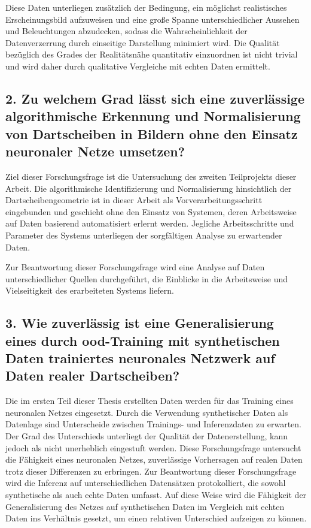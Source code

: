 Diese Daten unterliegen zusätzlich der Bedingung, ein möglichst realistisches Erscheinungsbild aufzuweisen und eine große Spanne unterschiedlicher Aussehen und Beleuchtungen abzudecken, sodass die Wahrscheinlichkeit der Datenverzerrung durch einseitige Darstellung minimiert wird. Die Qualität bezüglich des Grades der Realitätsnähe quantitativ einzuordnen ist nicht trivial und wird daher durch qualitative Vergleiche mit echten Daten ermittelt.

\subsection*{2. Zu welchem Grad lässt sich eine zuverlässige algorithmische Erkennung und Normalisierung von Dartscheiben in Bildern ohne den Einsatz neuronaler Netze umsetzen?}

Ziel dieser Forschungsfrage ist die Untersuchung des zweiten Teilprojekts dieser Arbeit. Die algorithmische Identifizierung und Normalisierung hinsichtlich der Dartscheibengeometrie ist in dieser Arbeit als Vorverarbeitungsschritt eingebunden und geschieht ohne den Einsatz von Systemen, deren Arbeitsweise auf Daten basierend automatisiert erlernt werden. Jegliche Arbeitsschritte und Parameter des Systems unterliegen der sorgfältigen Analyse zu erwartender Daten.

Zur Beantwortung dieser Forschungsfrage wird eine Analyse auf Daten unterschiedlicher Quellen durchgeführt, die Einblicke in die Arbeitsweise und Vielseitigkeit des erarbeiteten Systems liefern.

\subsection*{3. Wie zuverlässig ist eine Generalisierung eines durch \ac{ood}-Training mit synthetischen Daten trainiertes neuronales Netzwerk auf Daten realer Dartscheiben?}

Die im ersten Teil dieser Thesis erstellten Daten werden für das Training eines neuronalen Netzes eingesetzt. Durch die Verwendung synthetischer Daten als Datenlage sind Unterscheide zwischen Trainings- und Inferenzdaten zu erwarten. Der Grad des Unterschieds unterliegt der Qualität der Datenerstellung, kann jedoch als nicht unerheblich eingestuft werden. Diese Forschungsfrage untersucht die Fähigkeit eines neuronalen Netzes, zuverlässige Vorhersagen auf realen Daten trotz dieser Differenzen zu erbringen. Zur Beantwortung dieser Forschungsfrage wird die Inferenz auf unterschiedlichen Datensätzen protokolliert, die sowohl synthetische als auch echte Daten umfasst. Auf diese Weise wird die Fähigkeit der Generalisierung des Netzes auf synthetischen Daten im Vergleich mit echten Daten ins Verhältnis gesetzt, um einen relativen Unterschied aufzeigen zu können.

